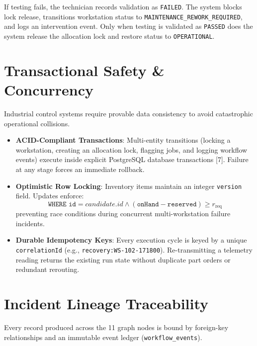 \documentclass[10pt,twocolumn,a4paper]{article}
\begin{document}
If testing fails, the technician records validation as \texttt{FAILED}. The system blocks lock release, transitions workstation status to \texttt{MAINTENANCE\_REWORK\_REQUIRED}, and logs an intervention event. Only when testing is validated as \texttt{PASSED} does the system release the allocation lock and restore status to \texttt{OPERATIONAL}.

\section{Transactional Safety \& Concurrency}
\label{sec:transactions}
Industrial control systems require provable data consistency to avoid catastrophic operational collisions.

\begin{itemize}
    \item \textbf{ACID-Compliant Transactions}: Multi-entity transitions (locking a workstation, creating an allocation lock, flagging jobs, and logging workflow events) execute inside explicit PostgreSQL database transactions [7]. Failure at any stage forces an immediate rollback.
    \item \textbf{Optimistic Row Locking}: Inventory items maintain an integer \texttt{version} field. Updates enforce:
    \begin{equation}
        \texttt{WHERE id} = candidate.id \land (\texttt{onHand} - \texttt{reserved}) \ge r_{\text{req}}
    \end{equation}
    preventing race conditions during concurrent multi-workstation failure incidents.
    \item \textbf{Durable Idempotency Keys}: Every execution cycle is keyed by a unique \texttt{correlationId} (e.g., \texttt{recovery:WS-102-171800}). Re-transmitting a telemetry reading returns the existing run state without duplicate part orders or redundant rerouting.
\end{itemize}

\section{Incident Lineage Traceability}
\label{sec:traceability}
Every record produced across the 11 graph nodes is bound by foreign-key relationships and an immutable event ledger (\texttt{workflow\_events}).
\end{document}
